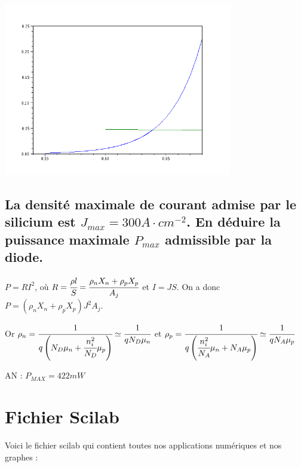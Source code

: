 \documentclass[10pt]{article}
\begin{document}
   \begin{center}\includegraphics[width=10cm]{III-2.png}\end{center}
  
  \subsection{La densité maximale de courant admise par le silicium est $J_{max} = 300 A\cdot cm^{-2}$. En déduire la puissance maximale $P_{max}$ admissible par la diode.}
  $P=RI^2$, où $R=\cfrac{\rho l}{S} = \cfrac{\rho_n X_n + \rho_p X_p}{A_j}$ et $I=JS$. On a donc $P=(\rho_n X_n + \rho_p X_p) J^2 A_j$. 
  
  Or $\rho_n = \cfrac{1}{q\left(N_D \mu_n + \cfrac{n_i^2}{N_D} \mu_p\right)} \simeq \cfrac{1}{q N_D \mu_n}$ et $\rho_p = \cfrac{1}{q\left(\cfrac{n_i^2}{N_A}\mu_n+N_A \mu_p\right)} \simeq \cfrac{1}{q N_A \mu_p}$

  AN : $P_{MAX} = 422mW$
 
 \section{Fichier Scilab}
  Voici le fichier scilab qui contient toutes nos applications numériques et nos graphes :

  \inputminted[linenos]{matlab}{calculs.sci}
\end{document}
